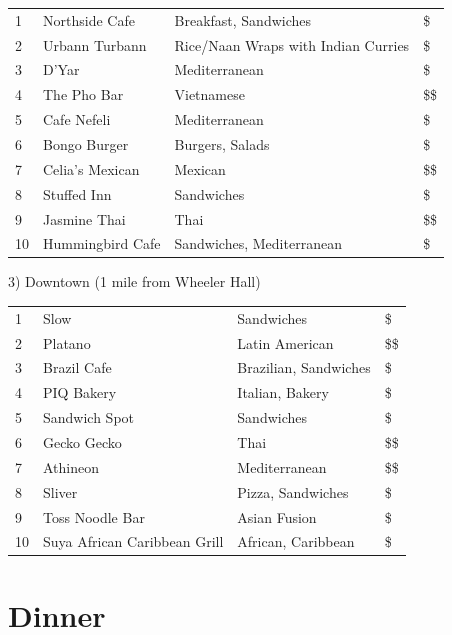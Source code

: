 \begingroup
\small
\begin{multicols}{1}[]
    \begin{tabular}{p{0.3cm} p{4cm} p{5cm} p{0.5cm}}
        1 & Northside Cafe & Breakfast, Sandwiches & \$\\
        2 & Urbann Turbann & Rice/Naan Wraps with Indian Curries & \$\\
        3 & D'Yar & Mediterranean & \$\\
        4 & The Pho Bar & Vietnamese  & \$\$\\
        5 & Cafe Nefeli & Mediterranean & \$\\ 
        6 & Bongo Burger & Burgers, Salads & \$\\
        7 & Celia's Mexican & Mexican & \$\$\\
        8 & Stuffed Inn & Sandwiches & \$\\
        9 & Jasmine Thai & Thai & \$\$\\
        10 & Hummingbird Cafe & Sandwiches, Mediterranean & \$\\
    \end{tabular}
\end{multicols}
\endgroup
\normalsize 

3) Downtown (1 mile from Wheeler Hall)

\begingroup
\small
\begin{multicols}{1}[]
    \begin{tabular}{p{0.3cm} p{4cm} p{5cm} p{0.5cm}}
        1 & Slow & Sandwiches & \$\\
        2 & Platano & Latin American & \$\$\\
        3 & Brazil Cafe & Brazilian, Sandwiches & \$\\
        4 & PIQ Bakery & Italian, Bakery  & \$\\
        5 & Sandwich Spot & Sandwiches & \$\\ 
        6 & Gecko Gecko & Thai & \$\$\\
        7 & Athineon & Mediterranean & \$\$\\
        8 & Sliver & Pizza, Sandwiches & \$\\
        9 & Toss Noodle Bar & Asian Fusion & \$\\
        10 & Suya African Caribbean Grill & African, Caribbean & \$\\
    \end{tabular}
\end{multicols}
\endgroup
\normalsize 

 \section{Dinner}

